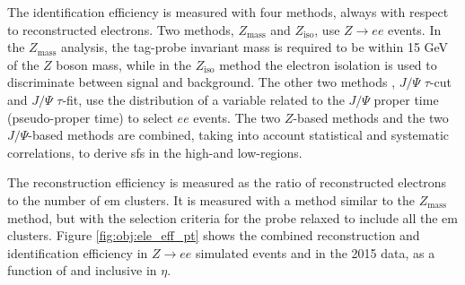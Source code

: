 The identification efficiency is measured with four methods, always with respect to reconstructed electrons. Two methods, $Z_\mathrm{mass}$ and $Z_\mathrm{iso}$, use $Z\rightarrow e e$ events. 
In the $Z_\mathrm{mass}$ analysis, the tag-probe invariant mass is required to be within 15 GeV of the $Z$ boson mass, while in the $Z_\mathrm{iso}$ method the electron isolation is used to discriminate between signal and background. The other two methods \cite{ATLAS-CONF-2014-032}, $J/\Psi$ $\tau$-cut and $J/\Psi$ $\tau$-fit, use the distribution of a variable related to the $J/\Psi$ proper time (pseudo-proper time) to select $ee$ events. 
The two $Z$-based methods and the two $J/\Psi$-based methods are combined, taking into account statistical and systematic correlations, to 
derive \glspl{sf} in the high-\et and low-\et regions. 


The reconstruction efficiency is measured as the ratio of reconstructed electrons to the number of \gls{em} clusters. 
It is measured with a method similar to the $Z_\mathrm{mass}$ method, but with the selection criteria for the probe relaxed to include all the \gls{em} clusters. Figure \ref{fig:obj:ele_eff_pt} shows the combined reconstruction and identification efficiency in $Z\rightarrow e e$ simulated events and in the 2015 data, as a function of \et and inclusive in $\eta$.

